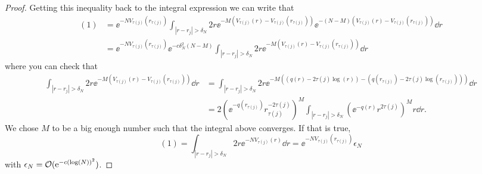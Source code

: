 \begin{proof}
Getting this inequality back to the integral expression we can write that 
\begin{align}
	(1) & =  \ee^{-N V_{\tau(j)}(r_{\tau(j)})} \int_{|r - r_j| > \delta_N} 2r \ee^{-M \left( V_{\tau(j)}(r) - V_{\tau(j)}(r_{\tau(j)}) \right)}  \ee^{-(N-M) \left( V_{\tau(j)}(r) - V_{\tau(j)}(r_{\tau(j)}) \right)} \dd r \\
	& = \ee^{-N V_{\tau(j)}(r_{\tau(j)})}  \ee^{- c \delta_N^2 (N - M)} \int_{|r - r_j| > \delta_N} 2r \ee^{-M \left( V_{\tau(j)}(r) - V_{\tau(j)}(r_{\tau(j)}) \right)} \dd r
\end{align}
where you can check that
\begin{align}
	\int_{|r - r_j| > \delta_N} 2r \ee^{-M \left( V_{\tau(j)}(r) - V_{\tau(j)}(r_{\tau(j)}) \right)} \dd r & = \int_{|r - r_j| > \delta_N} 2r \ee^{-M \left( (q(r) - 2 \tau(j) \log(r)) - (q(r_{\tau(j)}) - 2 \tau(j) \log(r_{\tau(j)})) \right)} \dd r  \\
	& = 2 \left( \ee^{-q(r_{\tau(j)})} r_{\tau(j)}^{-2 \tau(j)} \right)^M \int_{|r - r_j| > \delta_N} \left( \ee^{-q(r)} r^{2 \tau(j)} \right)^M r \dd r.
\end{align}
We chose $M$ to be a big enough number such that the integral above converges. If that is true, 
\begin{equation}
	(1) = \int_{|r - r_j| > \delta_N} 2r \ee^{-N V_{\tau(j)}(r)} \dd r = \ee^{-N V_{\tau(j)}(r_{\tau(j)})} \epsilon_N
\end{equation}
with $\epsilon_N = \mathcal{O}(\operatorname{e}^{-c(\log(N))^2})$.  


\end{proof}
